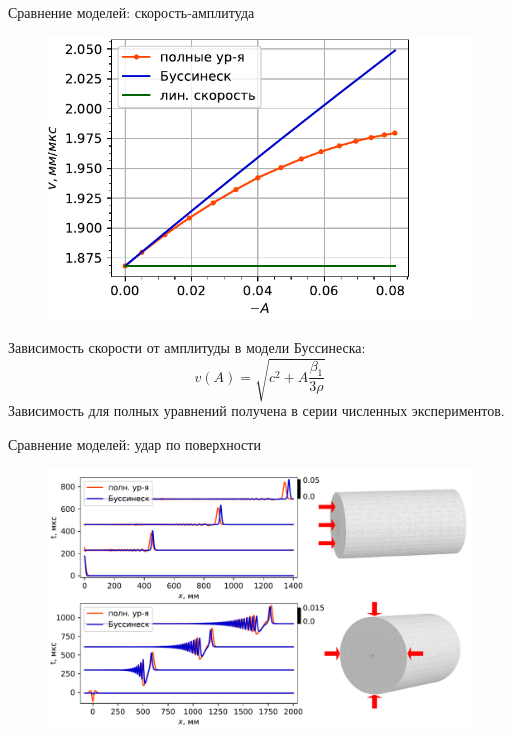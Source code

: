 \documentclass{beamer}
\DeclareMathOperator{\erf}{erf}
\newcommand{\lb}{\left (}
\newcommand{\rb}{\right )}
\newcommand{\pdiff}[2]{\frac{\partial #1}{\partial #2}}
\begin{document}
\begin{frame}{Сравнение моделей: скорость-амплитуда}
\begin{figure}
	\includegraphics[width=\linewidth]{figures/VelAmplColor}
\end{figure}
Зависимость скорости от амплитуды в модели Буссинеска:
\begin{equation}\nonumber
v(A) = \sqrt{c^2 + A\frac{\beta_1}{3\rho}}
\end{equation}
Зависимость для полных уравнений получена в серии численных экспериментов.\\
\end{frame}


\begin{frame}{Сравнение моделей: удар по поверхности}
\begin{figure}[h]
	\centering
	\includegraphics[width=\linewidth]{figures/Impact2Color_mod}
\end{figure}
\end{frame}
\end{document}
